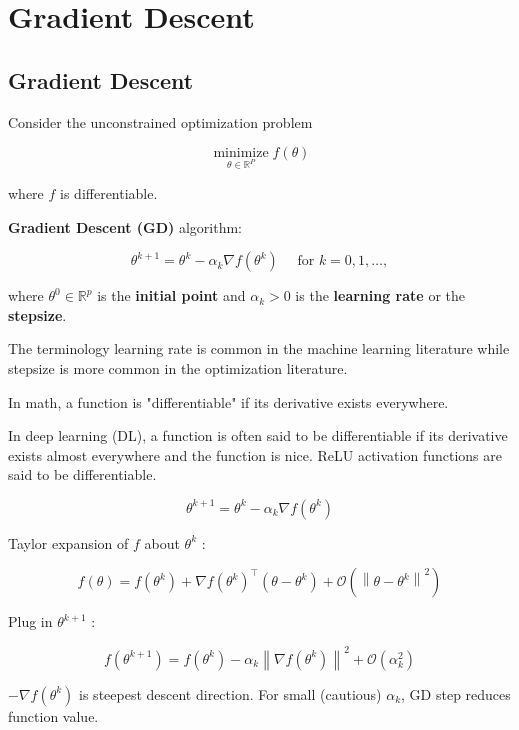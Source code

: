 \chapter{Gradient Descent}

\section{Gradient Descent}

\begin{definition}
    Consider the unconstrained optimization problem

    $$
    \underset{\theta \in \mathbb{R}^{P}}{\operatorname{minimize}} f(\theta)
    $$

    where $f$ is differentiable.

    \textbf{Gradient Descent (GD)} algorithm:

    $$
    \theta^{k+1}=\theta^{k}-\alpha_{k} \nabla f\left(\theta^{k}\right) \quad \text { for } k=0,1, \ldots,
    $$

    where $\theta^{0} \in \mathbb{R}^{p}$ is the \textbf{initial point} and $\alpha_{k}>0$ is the \textbf{learning rate} or the \textbf{stepsize}.

    The terminology learning rate is common in the machine learning literature while stepsize is more common in the optimization literature.
\end{definition}

In math, a function is "differentiable" if its derivative exists everywhere.

In deep learning (DL), a function is often said to be differentiable if its derivative exists almost everywhere and the function is nice.
ReLU activation functions are said to be differentiable.

\begin{concept}
    $$
    \theta^{k+1}=\theta^{k}-\alpha_{k} \nabla f\left(\theta^{k}\right)
    $$

    Taylor expansion of $f$ about $\theta^{k}$ :

    $$
    f(\theta)=f\left(\theta^{k}\right)+\nabla f\left(\theta^{k}\right)^{\top}\left(\theta-\theta^{k}\right)+\mathcal{O}\left(\left\|\theta-\theta^{k}\right\|^{2}\right)
    $$

    Plug in $\theta^{k+1}$ :

    $$
    f\left(\theta^{k+1}\right)=f\left(\theta^{k}\right)-\alpha_{k}\left\|\nabla f\left(\theta^{k}\right)\right\|^{2}+\mathcal{O}\left(\alpha_{k}^{2}\right)
    $$

    $-\nabla f\left(\theta^{k}\right)$ is steepest descent direction. For small (cautious) $\alpha_{k}$, GD step reduces function value.
\end{concept}

